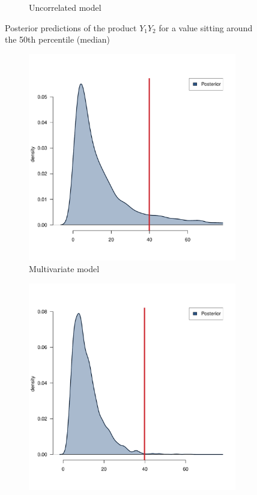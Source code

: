 \begin{figure}[htb]
\begin{subfigure}{0.4\textwidth}
		\caption{Uncorrelated model}
		\label{fig:cdiagram}
	\end{subfigure}
	\caption{Posterior predictions of the product \( Y_1 Y_2 \) for a value sitting around the 50\textup{th} percentile (\ie median)}
	\label{fig::res-15}
\end{figure}

\begin{figure}[htb]
	\centering
	\begin{subfigure}{0.4\textwidth}
		\includegraphics{./Figures/85th-percentile_corr.pdf}
		\caption{Multivariate model}
		\label{fig:capparatus}
	\end{subfigure}
	\hfil
	\begin{subfigure}{0.4\textwidth}
		\includegraphics{./Figures/85th-percentile_uncorr.pdf}

\end{subfigure}
\end{figure}
